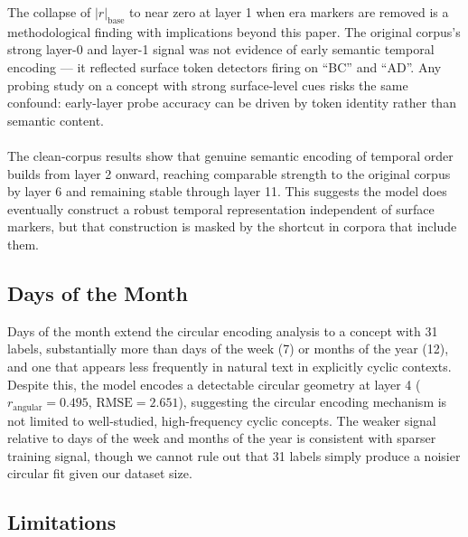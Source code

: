 \documentclass[11pt]{article}
\begin{document}
The collapse of $|r|_{\text{base}}$ to near zero at layer 1 when era markers are removed is a methodological finding with implications
beyond this paper. The original corpus's strong layer-0 and layer-1 signal was not evidence of early semantic temporal encoding ---
it reflected surface token detectors firing on ``BC'' and ``AD''. Any probing study on a concept with strong surface-level cues
risks the same confound: early-layer probe accuracy can be driven by token identity rather than semantic content.
\\
\\
The clean-corpus results show that genuine semantic encoding of temporal order builds from layer 2 onward, reaching comparable
strength to the original corpus by layer 6 and remaining stable through layer 11. This suggests the model does eventually construct
a robust temporal representation independent of surface markers, but that construction is masked by the shortcut in corpora that
include them. 
\subsection{Days of the Month}

Days of the month extend the circular encoding analysis to a concept with 31 labels, substantially more than days of the week (7)
or months of the year (12), and one that appears less frequently in natural text in explicitly cyclic contexts. Despite this,
the model encodes a detectable circular geometry at layer 4 ($r_{\text{angular}} = 0.495$, $\text{RMSE} = 2.651$), suggesting the
circular encoding mechanism is not limited to well-studied, high-frequency cyclic concepts. The weaker signal relative to days of
the week and months of the year is consistent with sparser training signal, though we cannot rule out that 31 labels simply produce
a noisier circular fit given our dataset size.

\subsection{Limitations}
\end{document}

